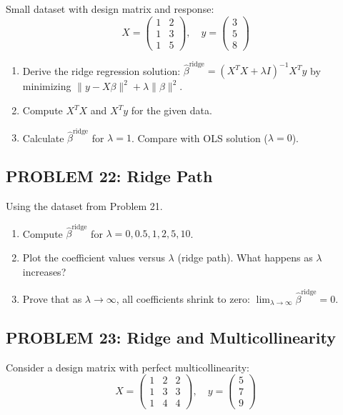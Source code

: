 \documentclass[12pt]{article}
\begin{document}
Small dataset with design matrix and response:
\[
X = \begin{pmatrix} 1 & 2 \\ 1 & 3 \\ 1 & 5 \end{pmatrix}, \quad
y = \begin{pmatrix} 3 \\ 5 \\ 8 \end{pmatrix}
\]

\begin{enumerate}
\item[(a)] Derive the ridge regression solution: \(\hat{\beta}^{\text{ridge}} = (X^TX + \lambda I)^{-1}X^Ty\) by minimizing \(\|y - X\beta\|^2 + \lambda\|\beta\|^2\).
\item[(b)] Compute \(X^TX\) and \(X^Ty\) for the given data.
\item[(c)] Calculate \(\hat{\beta}^{\text{ridge}}\) for \(\lambda = 1\). Compare with OLS solution (\(\lambda = 0\)).
\end{enumerate}

\subsection*{PROBLEM 22: Ridge Path}

Using the dataset from Problem 21.

\begin{enumerate}
\item[(a)] Compute \(\hat{\beta}^{\text{ridge}}\) for \(\lambda = 0, 0.5, 1, 2, 5, 10\).
\item[(b)] Plot the coefficient values versus \(\lambda\) (ridge path). What happens as \(\lambda\) increases?
\item[(c)] Prove that as \(\lambda \to \infty\), all coefficients shrink to zero: \(\lim_{\lambda \to \infty} \hat{\beta}^{\text{ridge}} = 0\).
\end{enumerate}

\subsection*{PROBLEM 23: Ridge and Multicollinearity}

Consider a design matrix with perfect multicollinearity:
\[
X = \begin{pmatrix}
1 & 2 & 2 \\
1 & 3 & 3 \\
1 & 4 & 4
\end{pmatrix}, \quad
y = \begin{pmatrix} 5 \\ 7 \\ 9 \end{pmatrix}
\]
\end{document}

